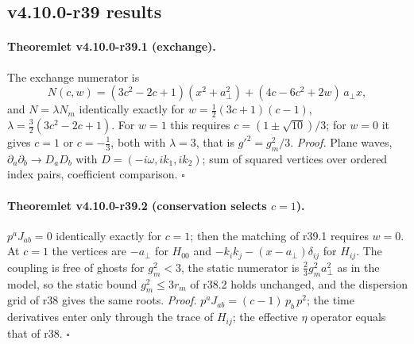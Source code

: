 \subsection*{v4.10.0-r39 results}
\label{subsec:v4100-r39-results}

\paragraph{Theoremlet v4.10.0-r39.1 (exchange).}
The exchange numerator is
\[
 N(c,w)=(3c^2-2c+1)(x^2+a_\perp^2)+(4c-6c^2+2w)\,a_\perp x ,
\]
and \(N=\lambda N_m\) identically exactly for \(w=\tfrac12(3c+1)(c-1)\), \(\lambda=\tfrac32(3c^2-2c+1)\).  For \(w=1\) this requires \(c=(1\pm\sqrt{10})/3\); for
\(w=0\) it gives \(c=1\) or \(c=-\tfrac13\), both with \(\lambda=3\), that is \(g'^2=g_m^2/3\).
\emph{Proof.} Plane waves, \(\partial_a\partial_b\to D_aD_b\) with \(D=(-i\omega,ik_1,ik_2)\); sum of squared vertices over ordered index pairs, coefficient
comparison.  \(\square\)

\paragraph{Theoremlet v4.10.0-r39.2 (conservation selects \(c=1\)).}
\(p^aJ_{ab}=0\) identically exactly for \(c=1\); then the matching of r39.1 requires \(w=0\).  At \(c=1\) the vertices are \(-a_\perp\) for \(H_{00}\) and
\(-k_ik_j-(x-a_\perp)\delta_{ij}\) for \(H_{ij}\).  The coupling is free of ghosts for \(g_m^2<3\), the static numerator is \(\tfrac23g_m^2a_\perp^2\) as in the model, so
the static bound \(g_m^2\le3r_m\) of r38.2 holds unchanged, and the dispersion grid of r38 gives the same roots.
\emph{Proof.} \(p^aJ_{ab}=(c-1)\,p_b\,p^2\); the time derivatives enter only through the trace of \(H_{ij}\); the effective \(\eta\) operator equals that of r38.  \(\square\)

